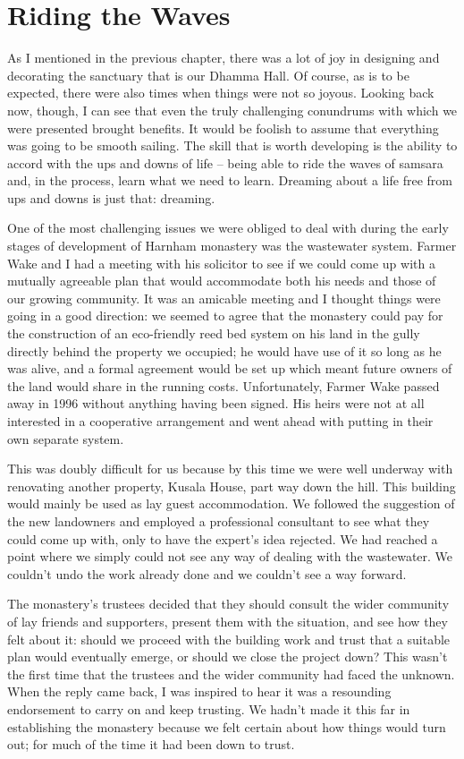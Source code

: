 \chapter[Riding the Waves]{\hspace*{13pt}Riding the Waves}

As I mentioned in the previous chapter, there was a lot of joy in
designing and decorating the sanctuary that is our Dhamma Hall. Of
course, as is to be expected, there were also times when things were not
so joyous. Looking back now, though, I can see that even the truly
challenging conundrums with which we were presented brought benefits. It
would be foolish to assume that everything was going to be smooth
sailing. The skill that is worth developing is the ability to accord
with the ups and downs of life -- being able to ride the waves of
samsara and, in the process, learn what we need to learn. Dreaming about
a life free from ups and downs is just that: dreaming.

One of the most challenging issues we were obliged to deal with during
the early stages of development of Harnham monastery was the wastewater
system. Farmer Wake and I had a meeting with his solicitor to see if we
could come up with a mutually agreeable plan that would accommodate both
his needs and those of our growing community. It was an amicable meeting
and I thought things were going in a good direction: we seemed to agree
that the monastery could pay for the construction of an eco-friendly
reed bed system on his land in the gully directly behind the property we
occupied; he would have use of it so long as he was alive, and a formal
agreement would be set up which meant future owners of the land would
share in the running costs. Unfortunately, Farmer Wake passed away in
1996 without anything having been signed. His heirs were not at all
interested in a cooperative arrangement and went ahead with putting in
their own separate system.

This was doubly difficult for us because by this time we were well
underway with renovating another property, Kusala House, part way down
the hill. This building would mainly be used as lay guest accommodation.
We followed the suggestion of the new landowners and employed a
professional consultant to see what they could come up with, only to
have the expert's idea rejected. We had reached a point where we simply
could not see any way of dealing with the wastewater. We couldn't undo
the work already done and we couldn't see a way forward.

The monastery's trustees decided that they should consult the wider
community of lay friends and supporters, present them with the
situation, and see how they felt about it: should we proceed with the
building work and trust that a suitable plan would eventually emerge, or
should we close the project down? This wasn't the first time that the
trustees and the wider community had faced the unknown. When the reply
came back, I was inspired to hear it was a resounding endorsement to
carry on and keep trusting. We hadn't made it this far in establishing
the monastery because we felt certain about how things would turn out;
for much of the time it had been down to trust.

